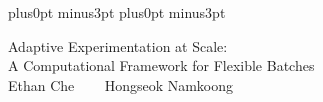 \documentclass[11pt]{article}
\begin{document}
\abovedisplayskip=8pt plus0pt minus3pt
\belowdisplayskip=8pt plus0pt minus3pt


\begin{center}
  {\huge Adaptive Experimentation at Scale: \\ A Computational Framework for Flexible
  Batches } \\
  \vspace{.5cm} {\Large Ethan Che ~~~ Hongseok Namkoong} \\
  \vspace{.2cm}
\end{center}










\end{document}
